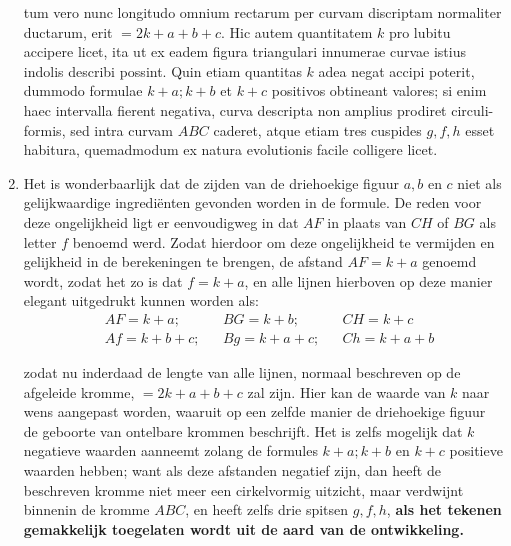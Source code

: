 \documentclass[10pt,a4paper]{article}
\newcommand{\switchenum}{\setcounter{enumi}{\arabic{enumi}-1}\switchcolumn}
\begin{document}
\begin{paracol}{2}
\begin{enumerate}[topsep=1px]
		\par tum vero nunc longitudo omnium rectarum per curvam discriptam normaliter ductarum, erit $= 2k+a+b+c$. Hic autem quantitatem $k$ pro lubitu accipere licet, ita ut ex eadem figura triangulari innumerae curvae istius indolis describi possint. Quin etiam quantitas $k$ adea negat accipi poterit, dummodo formulae $k+a; k+b$ et $k+c$ positivos obtineant valores; si enim haec intervalla fierent negativa, curva descripta non amplius prodiret circuli-formis, sed intra curvam $ABC$ caderet, atque etiam tres cuspides $g,f,h$ esset habitura, quemadmodum ex natura evolutionis facile colligere licet.
		
		\switchenum
		\item Het is wonderbaarlijk dat de zijden van de driehoekige figuur $a,b$ en $c$ niet als gelijkwaardige ingrediënten gevonden worden in de formule. De reden voor deze ongelijkheid ligt er eenvoudigweg in dat $AF$ in plaats van $CH$ of $BG$ als letter $f$ benoemd werd. Zodat hierdoor om deze ongelijkheid te vermijden en gelijkheid in de berekeningen te brengen, de afstand $AF= k+a$ genoemd wordt, zodat het zo is dat $f=k+a$, en alle lijnen hierboven op deze manier elegant uitgedrukt kunnen worden als:
		\begin{align*}
			&AF = k+a;  &&BG = k+b;   &&CH = k+c\\
			&Af = k+b+c;  &&Bg = k+a+c; &&Ch = k+a+b
		\end{align*}
		\par zodat nu inderdaad de lengte van alle lijnen, normaal beschreven op de afgeleide kromme, $=2k+a+b+c$ zal zijn. Hier kan de waarde van $k$ naar wens aangepast worden, waaruit op een zelfde manier de driehoekige figuur de geboorte van ontelbare krommen beschrijft. Het is zelfs mogelijk dat $k$ negatieve waarden aanneemt zolang de formules $k+a; k+b$ en $k+c$ positieve waarden hebben; want als deze afstanden negatief zijn, dan heeft de beschreven kromme niet meer een cirkelvormig uitzicht, maar verdwijnt binnenin de kromme $ABC$, en heeft zelfs drie spitsen $g,f,h$, \textbf{als het tekenen gemakkelijk toegelaten wordt uit de aard van de ontwikkeling.}
		
		\switchcolumn*
		

\end{enumerate}
\end{paracol}
\end{document}

